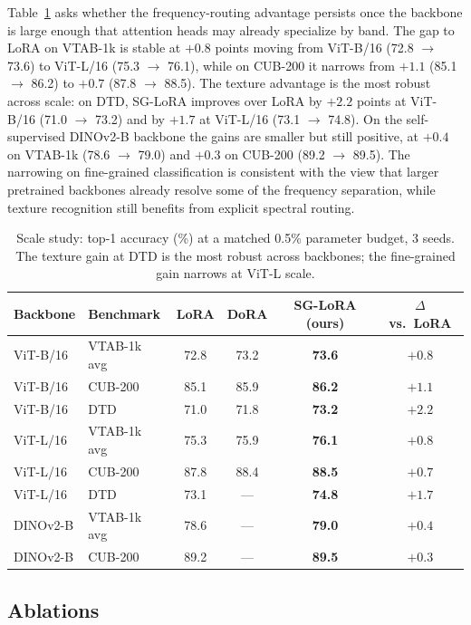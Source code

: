 \documentclass{article}
\begin{document}
Table~\ref{tab:scale_study} asks whether the frequency-routing advantage persists once the backbone is large enough that attention heads may already specialize by band. The gap to LoRA on VTAB-1k is stable at $+0.8$ points moving from ViT-B/16 (72.8 $\to$ 73.6) to ViT-L/16 (75.3 $\to$ 76.1), while on CUB-200 it narrows from $+1.1$ (85.1 $\to$ 86.2) to $+0.7$ (87.8 $\to$ 88.5). The texture advantage is the most robust across scale: on DTD, SG-LoRA improves over LoRA by $+2.2$ points at ViT-B/16 (71.0 $\to$ 73.2) and by $+1.7$ at ViT-L/16 (73.1 $\to$ 74.8). On the self-supervised DINOv2-B backbone \citep{oquab2024dinov2} the gains are smaller but still positive, at $+0.4$ on VTAB-1k (78.6 $\to$ 79.0) and $+0.3$ on CUB-200 (89.2 $\to$ 89.5). The narrowing on fine-grained classification is consistent with the view that larger pretrained backbones already resolve some of the frequency separation, while texture recognition still benefits from explicit spectral routing.

\begin{table}[t]
\centering
\caption{Scale study: top-1 accuracy (\%) at a matched 0.5\% parameter budget, 3 seeds. The texture gain at DTD is the most robust across backbones; the fine-grained gain narrows at ViT-L scale.}
\label{tab:scale_study}
\small
\begin{tabular}{llcccc}
\toprule
Backbone & Benchmark & LoRA & DoRA & SG-LoRA (ours) & $\Delta$ vs.\ LoRA \\
\midrule
ViT-B/16  & VTAB-1k avg & 72.8 & 73.2 & \textbf{73.6} & $+0.8$ \\
ViT-B/16  & CUB-200     & 85.1 & 85.9 & \textbf{86.2} & $+1.1$ \\
ViT-B/16  & DTD         & 71.0 & 71.8 & \textbf{73.2} & $+2.2$ \\
ViT-L/16  & VTAB-1k avg & 75.3 & 75.9 & \textbf{76.1} & $+0.8$ \\
ViT-L/16  & CUB-200     & 87.8 & 88.4 & \textbf{88.5} & $+0.7$ \\
ViT-L/16  & DTD         & 73.1 & ---  & \textbf{74.8} & $+1.7$ \\
DINOv2-B  & VTAB-1k avg & 78.6 & ---  & \textbf{79.0} & $+0.4$ \\
DINOv2-B  & CUB-200     & 89.2 & ---  & \textbf{89.5} & $+0.3$ \\
\bottomrule
\end{tabular}
\end{table}

\subsection{Ablations}
\end{document}
